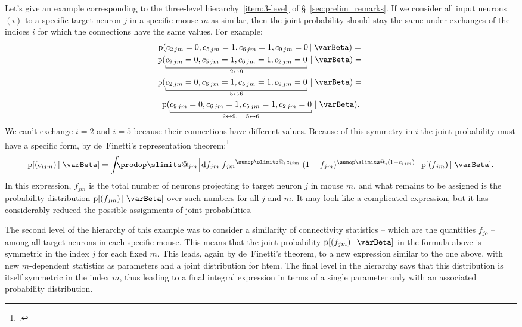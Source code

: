 \documentclass[\ifafour a4paper,12pt,\else a5paper,10pt,\fi%
onecolumn,oneside,article,%
british%
]{memoir}
\makeatletter
\theoremstyle{remark}
\theoremstyle{innote}
\def\sum{\DOTSI\sumop\slimits@}
\def\prod{\DOTSI\prodop\slimits@}
\newcommand*{\citep}{\footcites}
\newcommand*{\di}{\mathrm{d}}%
\newcommand*{\pf}{\mathrm{p}}%
\renewcommand*{\|}[1][]{\nonscript\,#1\vert\nonscript\;\mathopen{}}
\newcommand*{\sect}{\S}%
\newcommand*{\yI}{\varBeta}
\newcommand*{\yc}{c}
\makeatother
\begin{document}
Let's give an example corresponding to the three-level
hierarchy~\ref{item:3-level} of \sect~\ref{sec:prelim_remarks}. If we
consider all input neurons $(i)$ to a specific target neuron $j$ in a
specific mouse $m$ as similar, then the joint probability should stay the
same under exchanges of the indices $i$ for which the connections have the
same values. For example:
\begin{multline}
  \label{eq:example_exchange_i}
  \pf(\yc_{2\,jm}=0, \yc_{5\,jm}=1, \yc_{6\,jm}=1, \yc_{9\,jm}=0 \| \yI) ={}\\
  \pf(\underbracket[0.5pt]{\yc_{9\,jm}=0, \yc_{5\,jm}=1, \yc_{6\,jm}=1, \yc_{2\,jm}=0}_{2\leftrightarrow 9} \| \yI) ={}\\
  \pf(\underbracket[0.5pt]{\yc_{2\,jm}=0, \yc_{6\,jm}=1, \yc_{5\,jm}=1, \yc_{9\,jm}=0}_{5\leftrightarrow 6} \| \yI) ={}\\
  \pf(\underbracket[0.5pt]{\yc_{9\,jm}=0, \yc_{6\,jm}=1, \yc_{5\,jm}=1, \yc_{2\,jm}=0}_{2\leftrightarrow 9,\quad 5\leftrightarrow 6} \| \yI).
\end{multline}
We can't exchange $i=2$ and $i=5$ because their connections have different
values. Because of this symmetry in $i$ the joint probability must have a
specific form, by de~Finetti's representation
theorem:\citep{definetti1930,hewittetal1955,heathetal1976,diaconis1977,diaconisetal1980,dawid2013}
\begin{equation}
  \label{eq:definetti_example_i}
  \pf[(\yc_{ijm}) \| \yI] =
  \int\!\!\!\prod_{jm}\Bigl[\di f_{jm}\;
  {f_{jm}}^{\sum_{i}\yc_{ijm}}\;(1-f_{jm})^{\sum_{i}(1-\yc_{ijm})}\Bigr]\;
  \pf[(f_{jm}) \| \yI].
\end{equation}
In this expression, $f_{jm}$ is the total number of neurons projecting to
target neuron $j$ in mouse $m$, and what remains to be assigned is the
probability distribution $\pf[(f_{jm}) \| \yI]$ over such numbers for all
$j$ and $m$. It may look like a complicated expression, but it has
considerably reduced the possible assignments of joint probabilities.

The second level of the hierarchy of this example was to consider a
similarity of connectivity statistics -- which are the quantities $f_{jo}$
-- among all target neurons in each specific mouse. This means that the
joint probability $\pf[(f_{jm}) \| \yI]$ in the formula above is symmetric
in the index $j$ for each fixed $m$. This leads, again by de~Finetti's
theorem, to a new expression similar to the one above, with new
$m$-dependent statistics as parameters and a joint distribution for htem.
The final level in the hierarchy says that this distribution is itself
symmetric in the index $m$, thus leading to a final integral expression in
terms of a single parameter only with an associated probability
distribution.
\end{document}
